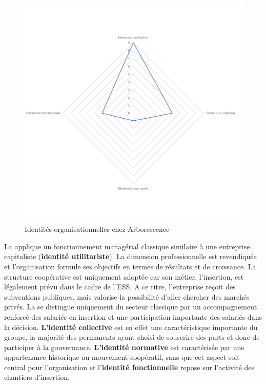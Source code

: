         \begin{figure}[h]
            \caption{Identités organisationnelles chez Arborescence}
            \label{figure:dimarborescence}
            \includegraphics[width=\linewidth]{fig/radars/Arbo.png}
        \end{figure}

        La \scic applique un fonctionnement managérial classique similaire à une entreprise capitaliste (\textbf{identité utilitariste}). La dimension professionnelle est revendiquée et l’organisation formule ses objectifs en termes de résultats et de croissance. La structure coopérative est uniquement adoptée car son métier, l’insertion, est légalement prévu dans le cadre de l’ESS. A ce titre, l’entreprise reçoit des subventions publiques, mais valorise la possibilité d’aller chercher des marchés privés. La \scic se distingue uniquement du secteur classique par un accompagnement renforcé des salariés en insertion et une participation importante des salariés dans la décision. \textbf{L'identité collective} est en effet une caractéristique importante du groupe, la majorité des permanents ayant choisi de souscrire des parts et donc de participer à la gouvernance. \textbf{L'identité normative} est caractérisée par une appartenance historique au mouvement coopératif, sans que cet aspect soit central pour l’organisation et l'\textbf{identité fonctionnelle} repose sur l'activité des chantiers d'insertion. \\

